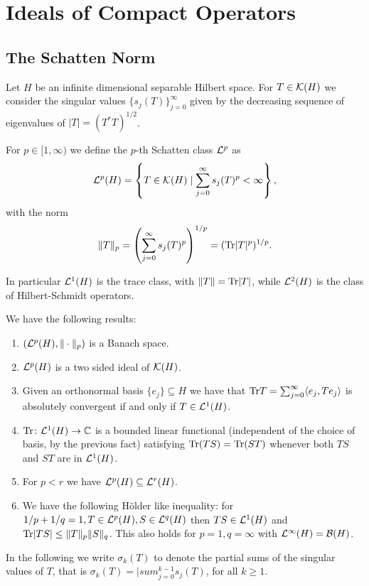 \section{Ideals of Compact Operators}
\subsection{The Schatten Norm}
Let $H$ be an infinite dimensional separable Hilbert space. For $T\in\mathcal{K}(H)$ we consider the singular values $\{s_j(T)\}_{j=0}^\infty$ given by the decreasing sequence of eigenvalues of $|T|=(T^\ast T)^{1/2}$.

\begin{definition}
 For $p\in[1,\infty)$ we define the $p$-th Schatten class $\mathcal{L}^p$ as 
 $$\mathcal{L}^p(H)=\left\{T\in\mathcal{K}(H)\mid\sum_{j=0}^\infty s_j(T)^p<\infty\right\},$$
 with the norm $$\|T\|_p=\left(\sum_{j=0}^\infty s_j(T)^p\right)^{1/p}=(\mathrm{Tr}|T|^p)^{1/p}.$$
\end{definition}

\noindent In particular $\mathcal{L}^1(H)$ is the trace class, with $\|T\|=\mathrm{Tr}|T|$, while $\mathcal{L}^2(H)$ is the class of Hilbert-Schmidt operators. 

\noindent We have the following results:
\begin{fact}
 \begin{enumerate}
  \item $(\mathcal{L}^p(H),\|\cdot\|_p)$ is a Banach space.
  \item $\mathcal{L}^p(H)$ is a two sided ideal of $\mathcal{K}(H)$.
  \item Given an orthonormal basis $\{e_j\}\subseteq H$ we have that $\mathrm{Tr} T=\sum_{j=0}^\infty\langle e_j, Te_j\rangle$ is absolutely convergent if and only if $T\in\mathcal{L}^1(H)$.
  \item $\mathrm{Tr}\colon\mathcal{L}^1(H)\to\mathbb{C}$ is a bounded linear functional (independent of the choice of basis, by the previous fact) satisfying $\mathrm{Tr}(TS)=\mathrm{Tr}(ST)$ whenever both $TS$ and $ST$ are in $\mathcal{L}^1(H)$.
  \item For $p<r$ we have $\mathcal{L}^p(H)\subseteq\mathcal{L}^r(H)$.
  \item We have the following Hölder like inequality: for $1/p+1/q=1,T\in\mathcal{L}^p(H),S\in\mathcal{L}^q(H)$ then $TS\in\mathcal{L}^1(H)$ and $\mathrm{Tr}|TS|\leq\|T\|_p\|S\|_q$. This also holds for $p=1,q=\infty$ with $\mathcal{L}^\infty(H)=\mathcal{B}(H)$.
 \end{enumerate}
\end{fact}

\noindent In the following we write $\sigma_k(T)$ to denote the partial sums of the singular values of $T$, that is $\sigma_k(T)=|sum_{j=0}^{k-1}s_j(T)$, for all $k\geq 1$.

